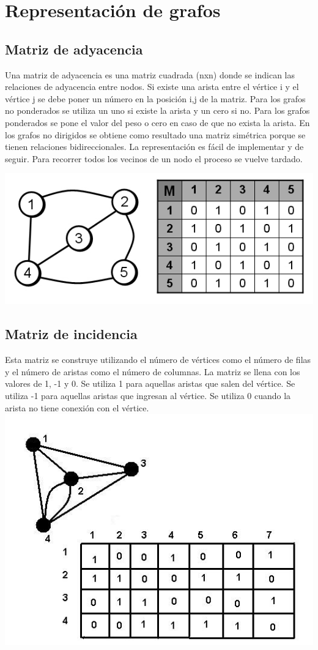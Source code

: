 \documentclass[twocolumn]{article}
\begin{document}
\section{Representación de grafos}
\subsection{Matriz de adyacencia}
Una matriz de adyacencia es una matriz cuadrada (nxn) donde se indican las relaciones de adyacencia entre nodos. Si existe una arista entre el vértice i y el vértice j se debe poner un número en la posición i,j de la matriz. Para los grafos no ponderados se utiliza un uno si existe la arista y un cero si no. Para los grafos ponderados se pone el valor del peso o cero en caso de que no exista la arista. En los grafos no dirigidos se obtiene como resultado una matriz simétrica porque se tienen relaciones bidireccionales.
La representación es fácil de implementar y de seguir. Para recorrer todos los vecinos de un nodo el proceso se vuelve tardado.


\includegraphics[width = .45\textwidth]{imagenes/Matriz_de_adyacencia.jpg}

\subsection{Matriz de incidencia}
Esta matriz se construye utilizando el número de vértices como el número de filas y el número de aristas como el número de columnas. La matriz se llena con los valores de 1, -1 y 0. Se utiliza 1 para aquellas aristas que salen del vértice. Se utiliza -1 para aquellas aristas que ingresan al vértice. Se utiliza 0 cuando la arista no tiene conexión con el vértice.
\cite{deepali}
\includegraphics[width = .45\textwidth]{imagenes/Matriz_de_incidencia.JPG}
\end{document}

